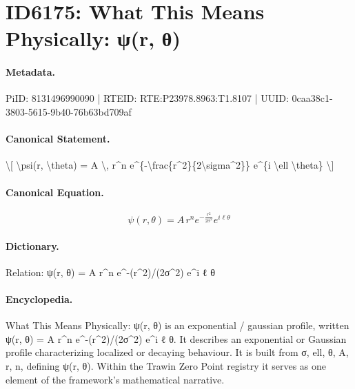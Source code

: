 \section*{ID6175: What This Means Physically: ψ(r, θ)}
\paragraph{Metadata.}
PiID: 8131496990090 | RTEID: RTE:P23978.8963:T1.8107 | UUID: 0caa38c1-3803-5615-9b40-76b63bd709af

\paragraph{Canonical Statement.}
\textbackslash{}[ \textbackslash{}psi(r, \textbackslash{}theta) = A \textbackslash{}, r\textasciicircum{}n e\textasciicircum{}\{-\textbackslash{}frac\{r\textasciicircum{}2\}\{2\textbackslash{}sigma\textasciicircum{}2\}\} e\textasciicircum{}\{i \textbackslash{}ell \textbackslash{}theta\} \textbackslash{}]

\paragraph{Canonical Equation.}
\[
\psi(r, \theta) = A \, r^n e^{-\frac{r^2}{2\sigma^2}} e^{i \ell \theta}
\]

\paragraph{Dictionary.}
Relation: ψ(r, θ) = A r\textasciicircum{}n e\textasciicircum{}-(r\textasciicircum{}2)/(2σ\textasciicircum{}2) e\textasciicircum{}i ℓ θ

\paragraph{Encyclopedia.}
What This Means Physically: ψ(r, θ) is an exponential / gaussian profile, written ψ(r, θ) = A r\textasciicircum{}n e\textasciicircum{}-(r\textasciicircum{}2)/(2σ\textasciicircum{}2) e\textasciicircum{}i ℓ θ. It describes an exponential or Gaussian profile characterizing localized or decaying behaviour. It is built from σ, ell, θ, A, r, n, defining ψ(r, θ). Within the Trawin Zero Point registry it serves as one element of the framework's mathematical narrative.
